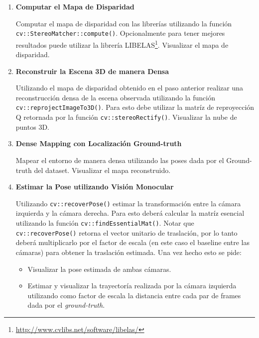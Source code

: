\documentclass[tp]{lcc}
\begin{document}
\begin{enumerate}
\item \textbf{Computar el Mapa de Disparidad}

Computar el mapa de disparidad con las librerías utilizando la función \lstinline{cv::StereoMatcher::compute()}. Opcionalmente para tener mejores resultados puede utilizar la librería LIBELAS\footnote{\url{http://www.cvlibs.net/software/libelas/}}. Visualizar el mapa de disparidad.

\item \textbf{Reconstruir la Escena 3D de manera Densa}

Utilizando el mapa de disparidad obtenido en el paso anterior realizar una reconstrucción densa de la escena observada utilizando la función \lstinline{cv::reprojectImageTo3D()}. Para esto debe utilizar la matríz de reproyección Q retornada por la función \lstinline{cv::stereoRectify()}. Visualizar la nube de puntos 3D.

\item \textbf{Dense Mapping con Localización Ground-truth}

Mapear el entorno de manera densa utilizando las poses dada por el Ground-truth del dataset. Visualizar el mapa reconstruido.

\item \textbf{Estimar la Pose utilizando Visión Monocular}

Utilizando \lstinline{cv::recoverPose()} estimar la transformación entre la cámara izquierda y la cámara derecha. Para esto deberá calcular la matríz esencial utilizando la función \lstinline{cv::findEssentialMat()}. Notar que \lstinline{cv::recoverPose()} retorna el vector unitario de traslación, por lo tanto deberá multiplicarlo por el factor de escala (en este caso el baseline entre las cámaras) para obtener la traslación estimada. Una vez hecho esto se pide:

\begin{itemize}
    \item Visualizar la pose estimada de ambas cámaras.
    \item Estimar y visualizar la trayectoría realizada por la cámara izquierda utilizando como factor de escala la distancia entre cada par de frames dada por el \emph{ground-truth}.
\end{itemize}


\end{enumerate}
\end{document}
